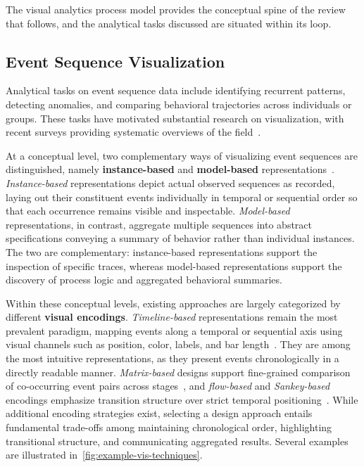 The visual analytics process model provides the conceptual spine of the review that follows, and the analytical tasks discussed are situated within its loop.



\subsection{Event Sequence Visualization}

Analytical tasks on event sequence data include identifying recurrent patterns, detecting anomalies, and comparing behavioral trajectories across individuals or groups.
These tasks have motivated substantial research on visualization, with recent surveys providing systematic overviews of the field~\cite{eltayeby2016survey, guo2022survey, yeshchenko2024survey, rubensson2025timeline}.

At a conceptual level, two complementary ways of visualizing event sequences are distinguished, namely \textbf{instance-based} and \textbf{model-based} representations~\cite{yeshchenko2024survey}.
\textit{Instance-based} representations depict actual observed sequences as recorded, laying out their constituent events individually in temporal or sequential order so that each occurrence remains visible and inspectable.
\textit{Model-based} representations, in contrast, aggregate multiple sequences into abstract specifications conveying a summary of behavior rather than individual instances.
The two are complementary: instance-based representations support the inspection of specific traces, whereas model-based representations support the discovery of process logic and aggregated behavioral summaries.

Within these conceptual levels, existing approaches are largely categorized by different \textbf{visual encodings}.
\textit{Timeline-based} representations remain the most prevalent paradigm, mapping events along a temporal or sequential axis using visual channels such as position, color, labels, and bar length~\cite{krstajic2011cloudlines, wongsuphasawat2011lifeflow, monroe2013temporal, vrotsou2014are, du2016eventaction}.
They are among the most intuitive representations, as they present events chronologically in a directly readable manner.
\textit{Matrix-based} designs support fine-grained comparison of co-occurring event pairs across stages~\cite{zhao2015matrixwave, binucci2026clusterix}, and \textit{flow-based} and \textit{Sankey-based} encodings emphasize transition structure over strict temporal positioning~\cite{wongsuphasawat2011outflow, gotz2014decisionflow}.
While additional encoding strategies exist, selecting a design approach entails fundamental trade-offs among maintaining chronological order, highlighting transitional structure, and communicating aggregated results.
Several examples are illustrated in~\cref{fig:example-vis-techniques}.

